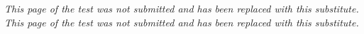 \documentclass[12pt,letterpaper]{article}
\begin{document}
\emph{This page of the test was not submitted and has been replaced with this substitute.}
\vfill
\emph{This page of the test was not submitted and has been replaced with this substitute.}
\end{document}
